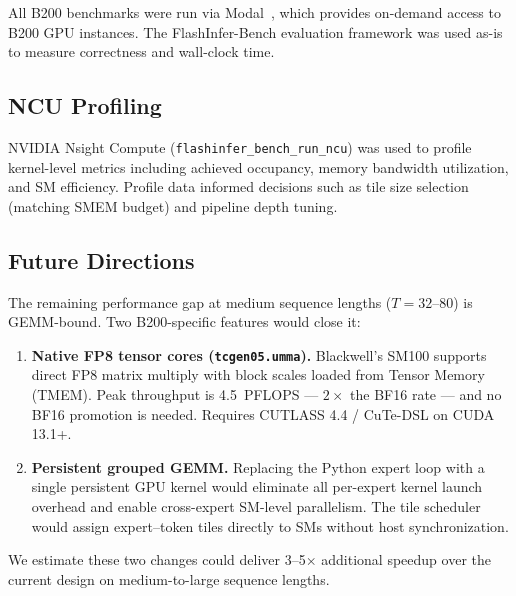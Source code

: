 All B200 benchmarks were run via Modal~\cite{flashinfer}, which provides
on-demand access to B200 GPU instances.  The FlashInfer-Bench evaluation
framework was used as-is to measure correctness and wall-clock time.

\subsection{NCU Profiling}

NVIDIA Nsight Compute (\texttt{flashinfer\_bench\_run\_ncu}) was used to
profile kernel-level metrics including achieved occupancy, memory bandwidth
utilization, and SM efficiency.  Profile data informed decisions such as
tile size selection (matching SMEM budget) and pipeline depth tuning.

\subsection{Future Directions}

The remaining performance gap at medium sequence lengths ($T = 32$--$80$)
is GEMM-bound.  Two B200-specific features would close it:

\begin{enumerate}[leftmargin=1.4em,itemsep=2pt]
  \item \textbf{Native FP8 tensor cores (\texttt{tcgen05.umma}).}
        Blackwell's SM100 supports direct FP8 matrix multiply with block
        scales loaded from Tensor Memory (TMEM).  Peak throughput is
        4.5~PFLOPS --- $2\times$ the BF16 rate --- and no BF16 promotion
        is needed.  Requires CUTLASS 4.4 / CuTe-DSL on CUDA 13.1+.
  \item \textbf{Persistent grouped GEMM.}
        Replacing the Python expert loop with a single persistent GPU kernel
        would eliminate all per-expert kernel launch overhead and enable
        cross-expert SM-level parallelism.  The tile scheduler would assign
        expert--token tiles directly to SMs without host synchronization.
\end{enumerate}

We estimate these two changes could deliver 3--5$\times$ additional speedup
over the current design on medium-to-large sequence lengths.
